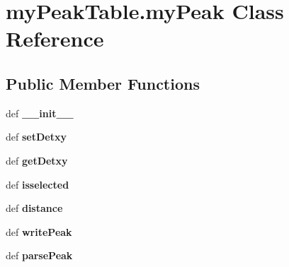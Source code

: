 \hypertarget{classmyPeakTable_1_1myPeak}{\section{my\-Peak\-Table.\-my\-Peak Class Reference}
\label{classmyPeakTable_1_1myPeak}
}
\subsection*{Public Member Functions}
\begin{DoxyCompactItemize}
\item 
\hypertarget{classmyPeakTable_1_1myPeak_a037a4088033f2adfaaa74c7352f70f48}{def {\bfseries \-\_\-\-\_\-init\-\_\-\-\_\-}}\label{classmyPeakTable_1_1myPeak_a037a4088033f2adfaaa74c7352f70f48}

\item 
\hypertarget{classmyPeakTable_1_1myPeak_ad3e58261d15c3ac0e64876ce79e2fb65}{def {\bfseries set\-Detxy}}\label{classmyPeakTable_1_1myPeak_ad3e58261d15c3ac0e64876ce79e2fb65}

\item 
\hypertarget{classmyPeakTable_1_1myPeak_a69641e1873ad1aeb01e9addef6aee25b}{def {\bfseries get\-Detxy}}\label{classmyPeakTable_1_1myPeak_a69641e1873ad1aeb01e9addef6aee25b}

\item 
\hypertarget{classmyPeakTable_1_1myPeak_acd0cd543ea0c89c12ab6a336b1898f8c}{def {\bfseries isselected}}\label{classmyPeakTable_1_1myPeak_acd0cd543ea0c89c12ab6a336b1898f8c}

\item 
\hypertarget{classmyPeakTable_1_1myPeak_a95656972d93036d4f594a8dffa41ac1a}{def {\bfseries distance}}\label{classmyPeakTable_1_1myPeak_a95656972d93036d4f594a8dffa41ac1a}

\item 
\hypertarget{classmyPeakTable_1_1myPeak_ac43b5ba516f16ab6b46c599c4167d8c8}{def {\bfseries write\-Peak}}\label{classmyPeakTable_1_1myPeak_ac43b5ba516f16ab6b46c599c4167d8c8}

\item 
\hypertarget{classmyPeakTable_1_1myPeak_ad7eb11ab3ecab620176505fd7e6ed7f1}{def {\bfseries parse\-Peak}}\label{classmyPeakTable_1_1myPeak_ad7eb11ab3ecab620176505fd7e6ed7f1}

\end{DoxyCompactItemize}
